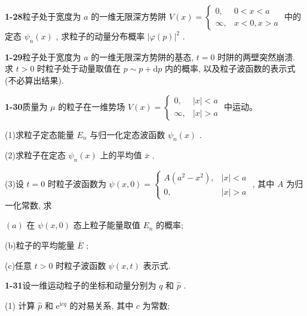 \vfill

\newpage

\textbf{1-28}\quad 粒子处于宽度为 $\displaystyle a$ 的一维无限深方势阱 $\displaystyle V(x) = \begin{cases} 0, & 0 < x < a \\ \infty, & x < 0, x > a \end{cases}$ 中的定态 $\displaystyle \psi_n(x)$ , 求粒子的动量分布概率 $\displaystyle \left|\varphi(p)\right|^2$ .

\vfill

\newpage

\textbf{1-29}\quad 粒子处于宽度为 $\displaystyle a$ 的一维无限深方势阱的基态, $\displaystyle t = 0$ 时阱的两壁突然崩溃. 求 $\displaystyle t > 0$ 时粒子处于动量取值在 $\displaystyle p \sim p + \mathrm{d}p$ 内的概率, 以及粒子波函数的表示式(不必算出结果).

\vfill

\newpage

\textbf{1-30}\quad 质量为 $\displaystyle \mu$ 的粒子在一维势场 $\displaystyle V(x) = \begin{cases} 0, & |x| < a \\ \infty, & |x| > a \end{cases}$ 中运动。

(1)求粒子定态能量 $\displaystyle E_{n}$ 与归一化定态波函数 $\displaystyle \psi_{n}(x)$ .

(2)求粒子在定态 $\displaystyle \psi_{n}(x)$ 上的平均值 $\displaystyle \overline{x}$ .

(3)设 $\displaystyle t = 0$ 时粒子波函数为 $\displaystyle \psi(x,0) = \begin{cases} A(a^2 - x^2), & |x| < a \\ 0, & |x| > a \end{cases}$ , 其中 $\displaystyle A$ 为归一化常数, 求

$\displaystyle (a)$ 在 $\displaystyle \psi(x,0)$ 态上粒子能量取值 $\displaystyle E_{n}$ 的概率;

(b)粒子的平均能量 $\displaystyle \overline{E}$ ;

(c)任意 $\displaystyle t > 0$ 时粒子波函数 $\displaystyle \psi(x,t)$ 表示式.

\vfill

\newpage

\textbf{1-31}\quad 设一维运动粒子的坐标和动量分别为 $\displaystyle q$ 和 $\displaystyle \hat{p}$ .

(1) 计算 $\displaystyle \hat{p}$ 和 $\displaystyle \mathrm{e}^{\mathrm{i}cq}$ 的对易关系, 其中 $\displaystyle c$ 为常数;


